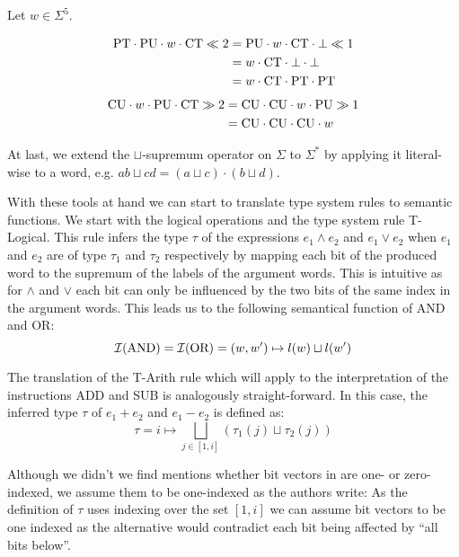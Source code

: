 \begin{example}
    Let $ w \in \Sigma^5 $.

    \begin{align*}
        \text{PT} \cdot \text{PU} \cdot w \cdot \text{CT} \ll 2 &= \text{PU} \cdot w \cdot \text{CT} \cdot \bot \ll 1 \\
        &= w \cdot \text{CT} \cdot \bot \cdot \bot \\
        &= w \cdot \text{CT} \cdot \text{PT} \cdot \text{PT}
    \end{align*}
    \begin{align*}
        \text{CU} \cdot w \cdot \text{PU} \cdot \text{CT} \gg 2 &= \text{CU} \cdot \text{CU} \cdot w \cdot \text{PU} \gg 1 \\
        &= \text{CU} \cdot \text{CU} \cdot \text{CU} \cdot w
    \end{align*}
\end{example}

At last, we extend the $ \sqcup $-supremum operator on $ \Sigma $ to $ \Sigma^* $ by applying it literal-wise to a word, e.g. $ ab \sqcup cd = (a \sqcup c) \cdot (b \sqcup d) $.

With these tools at hand we can start to translate type system rules to semantic functions.
We start with the logical operations and the type system rule T-Logical.
This rule infers the type $ \tau $ of the expressions $ e_1 \land e_2 $ and $ e_1 \lor e_2 $ when $ e_1 $ and $ e_2 $ are of type $ \tau_1 $ and $ \tau_2 $ respectively by mapping each bit of the produced word to the supremum of the labels of the argument words.
This is intuitive as for $ \land $ and $ \lor $ each bit can only be influenced by the two bits of the same index in the argument words.
This leads us to the following semantical function of AND and OR:
\begin{equation*}
    \mathcal{I}(\text{AND}) = \mathcal{I}(\text{OR}) = (w, w') \mapsto l(w) \sqcup l(w')
\end{equation*}

The translation of the T-Arith rule which will apply to the interpretation of the instructions ADD and SUB is analogously straight-forward.
In this case, the inferred type $ \tau $ of $ e_1 + e_2 $ and $ e_1 - e_2 $ is defined as:
\begin{equation*}
    \tau = i \mapsto \bigsqcup_{j \in [1, i]} (\tau_1(j) \sqcup \tau_2(j))
\end{equation*}

Although we didn't we find mentions whether bit vectors in \cite{Ferraiuolo17} are one- or zero-indexed, we assume them to be one-indexed as the authors write: 
As the definition of $ \tau $ uses indexing over the set $ [ 1, i ] $ we can assume bit vectors to be one indexed as the alternative would contradict each bit being affected by \enquote{all bits below}.

